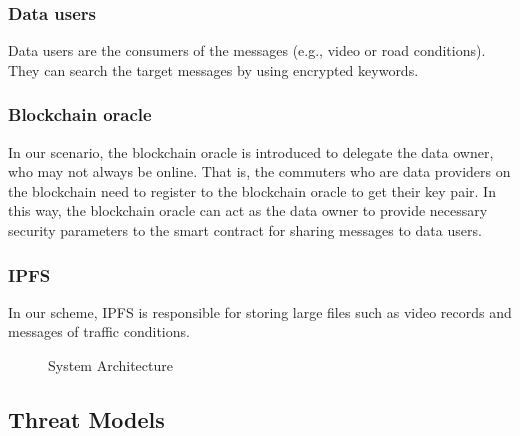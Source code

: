 \documentclass[journal]{IEEEtran}
\begin{document}
    \subsubsection{\textbf{Data users}}
    
    Data users are the consumers of the messages (e.g., video or road conditions). They can search the target messages by using encrypted keywords.
    
    \subsubsection{\textbf{Blockchain oracle}}
    
    In our scenario, the blockchain oracle is introduced to delegate the data owner, who may not always be online. That is, the commuters who are data providers on the blockchain need to register to the blockchain oracle to get their key pair. In this way, the blockchain oracle can act as the data owner to provide necessary security parameters to the smart contract for sharing messages to data users.
    
    \subsubsection{\textbf{IPFS}}
    
    In our scheme, IPFS is responsible for storing large files such as video records and messages of traffic conditions. 

\begin{figure}[h!]
    \centering
    \caption{System Architecture}
    \label{fig:architecture}
\end{figure}

    \subsection{Threat Models}
    
\end{document}
